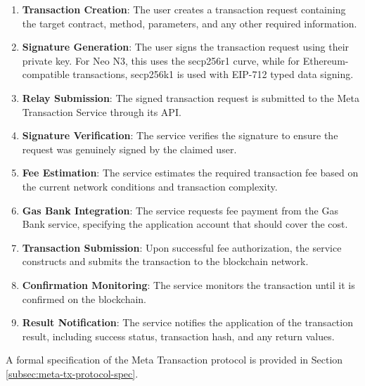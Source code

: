 \documentclass[11pt]{article}
\begin{document}
\begin{enumerate}
    \item \textbf{Transaction Creation}: The user creates a transaction request containing the target contract, method, parameters, and any other required information.
    
    \item \textbf{Signature Generation}: The user signs the transaction request using their private key. For Neo N3, this uses the secp256r1 curve, while for Ethereum-compatible transactions, secp256k1 is used with EIP-712 typed data signing.
    
    \item \textbf{Relay Submission}: The signed transaction request is submitted to the Meta Transaction Service through its API.
    
    \item \textbf{Signature Verification}: The service verifies the signature to ensure the request was genuinely signed by the claimed user.
    
    \item \textbf{Fee Estimation}: The service estimates the required transaction fee based on the current network conditions and transaction complexity.
    
    \item \textbf{Gas Bank Integration}: The service requests fee payment from the Gas Bank service, specifying the application account that should cover the cost.
    
    \item \textbf{Transaction Submission}: Upon successful fee authorization, the service constructs and submits the transaction to the blockchain network.
    
    \item \textbf{Confirmation Monitoring}: The service monitors the transaction until it is confirmed on the blockchain.
    
    \item \textbf{Result Notification}: The service notifies the application of the transaction result, including success status, transaction hash, and any return values.
\end{enumerate}

A formal specification of the Meta Transaction protocol is provided in Section \ref{subsec:meta-tx-protocol-spec}.


\end{document}
